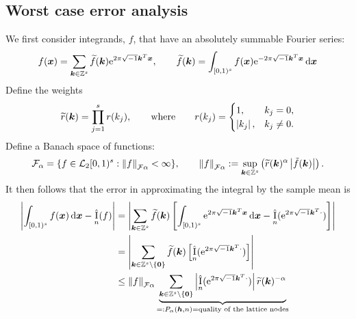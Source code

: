 \documentclass{amsart}
\newcommand{\tr}{\widetilde{r}}
\newcommand{\appxintn}{\appxint_n}
\DeclareMathOperator{\appxint}{\hat{I}}
\begin{document}
\subsection{Worst case error analysis}
We first consider integrands, $f$, that have an absolutely summable Fourier series:
\begin{equation} \label{eq:fseries}
    f(\boldsymbol{x}) = \sum_{\boldsymbol{k} \in \mathbb{Z}^s} \widetilde{f}(\boldsymbol{k}) \mathrm{e}^{2 \pi \sqrt{-1} \boldsymbol{k}^T \boldsymbol{x}}, \qquad \widetilde{f}(\boldsymbol{k}) = \int_{[0,1)^s} f(\boldsymbol{x}) \mathrm{e}^{-2 \pi \sqrt{-1} \boldsymbol{k}^T \boldsymbol{x}}\, {\rm d} \boldsymbol{x}
\end{equation}
Define the weights 
\begin{equation}
\tr(\vk) = \prod_{j=1}^{s} r(k_{j}),
\qquad \text{where} \qquad r(k_{j})=\begin{cases} 1, &
k_{j}=0, \\ \abs{k_{j}}, & k_{j} \ne 0.  \end{cases}
\end{equation}
Define a Banach
space of functions:
$$
\cf_{\alpha} = \{ f \in \cl_2[0,1)^s : 
\norm[\cf{\alpha}]{f} < \infty \}, \qquad
\norm[\cf{\alpha}]{f} := \sup_{\vk \in \integers^{s}}
\left(\tr(\vk)^{\alpha} \abs{\tilde{f}(\vk)} \right).
$$
It then follows that the error in approximating the integral by the sample mean is
\begin{align} \label{eq:wcerrPalpha}
\abs{\int_{[0,1)^s} f(\vx) \, \dif \vx - \appxint_n(f)} & 
= \abs{\sum_{\vk \in \integers^s} \tf(\vk) \left[\int_{[0,1)^s} \me^{2 \pi \sqrt{-1} \vk^T \vx} \, \dif \vx - \appxintn(\me^{2 \pi \sqrt{-1} \vk^T \cdot})\right]} \\
\nonumber
& = \abs{\sum_{\vk \in \integers^s \setminus\{\vzero\}} \tf(\vk) \left[ \appxintn(\me^{2 \pi \sqrt{-1} \vk^T \cdot})\right]} \\
\nonumber
& \le \norm[\cf{\alpha}]{f} \underbrace{\sum_{\vk \in \integers^s \setminus\{\vzero\}} \abs{\appxint_n(\me^{2 \pi \sqrt{-1} \vk^T \cdot})}\tr(\vk)^{-\alpha}}_{=: P_\alpha(\vh,n) = \text{quality of the lattice nodes}} \\
\nonumber
\end{align}
\end{document}
